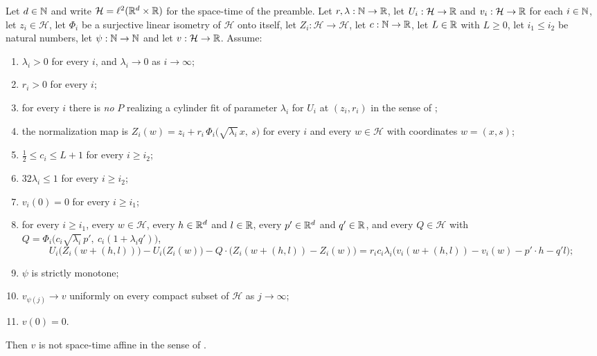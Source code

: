 \begin{lemma}
Let $d\in\mathbb{N}$ and write $\mathcal H=\ell^2(\mathbb{R}^d\times\mathbb{R})$ for the space-time of the
preamble. Let $r,\lambda:\mathbb{N}\to\mathbb{R}$, let $U_i:\mathcal H\to\mathbb{R}$ and
$v_i:\mathcal H\to\mathbb{R}$ for each $i\in\mathbb{N}$, let $z_i\in\mathcal H$, let $\Phi_i$ be a
surjective linear isometry of $\mathcal H$ onto itself, let
$Z_i:\mathcal H\to\mathcal H$, let $c:\mathbb{N}\to\mathbb{R}$, let $L\in\mathbb{R}$ with $L\ge0$, let
$i_1\le i_2$ be natural numbers, let $\psi:\mathbb{N}\to\mathbb{N}$ and let $v:\mathcal H\to\mathbb{R}$.
Assume:
\begin{enumerate}
\item\label{it:nlna-lam} $\lambda_i>0$ for every $i$, and $\lambda_i\to0$ as
$i\to\infty$;
\item\label{it:nlna-r} $r_i>0$ for every $i$;
\item\label{it:nlna-bad} for every $i$ there is \emph{no} $P$ realizing a
cylinder fit of parameter $\lambda_i$ for $U_i$ at $(z_i,r_i)$ in the sense of
;
\item\label{it:nlna-Z} the normalization map is
$Z_i(w)=z_i+r_i\,\Phi_i\bigl(\sqrt{\lambda_i}\,x,\ s\bigr)$ for every $i$ and
every $w\in\mathcal H$ with coordinates $w=(x,s)$;
\item\label{it:nlna-norm} $\tfrac12\le c_i\le L+1$ for every $i\ge i_2$;
\item\label{it:nlna-tail} $32\lambda_i\le1$ for every $i\ge i_2$;
\item\label{it:nlna-origin} $v_i(0)=0$ for every $i\ge i_1$;
\item\label{it:nlna-incr} for every $i\ge i_1$, every $w\in\mathcal H$, every
$h\in\mathbb{R}^d$ and $l\in\mathbb{R}$, every $p'\in\mathbb{R}^d$ and $q'\in\mathbb{R}$, and every
$Q\in\mathcal H$ with
$Q=\Phi_i\bigl(c_i\sqrt{\lambda_i}\,p',\ c_i(1+\lambda_iq')\bigr)$,
\[
  U_i\bigl(Z_i(w+(h,l))\bigr)-U_i\bigl(Z_i(w)\bigr)
    -Q\cdot\bigl(Z_i(w+(h,l))-Z_i(w)\bigr)
  =r_ic_i\lambda_i\bigl(v_i(w+(h,l))-v_i(w)-p'\cdot h-q'l\bigr);
\]
\item\label{it:nlna-mono} $\psi$ is strictly monotone;
\item\label{it:nlna-conv} $v_{\psi(j)}\to v$ uniformly on every compact subset of
$\mathcal H$ as $j\to\infty$;
\item\label{it:nlna-v0} $v(0)=0$.
\end{enumerate}
Then $v$ is not space-time affine in the sense of .
\end{lemma}
